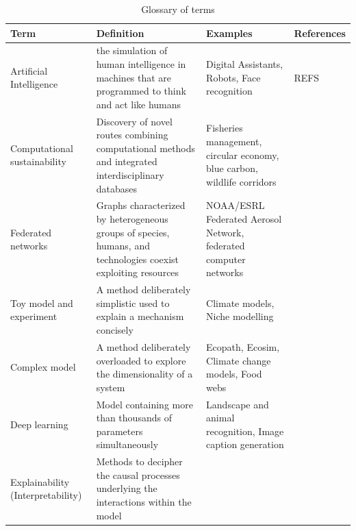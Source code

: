 \documentclass[12pt,a4paper]{article}
\begin{document}
\begin{table}[]
\begin{center}
\hspace{-0.8 in}\begin{tabular}{ |  p{2.6cm} | p{5cm} | p{4cm} | p{3cm} | }
\hline 
{\bf Term} & {\bf Definition} & {\bf Examples} & {\bf References} \tabularnewline
\hline 
Artificial Intelligence & the simulation of human intelligence in machines that are programmed to think and act like humans  & Digital Assistants, Robots, Face recognition & REFS \tabularnewline
\hline 
 Computational sustainability & Discovery of novel routes combining computational methods and integrated interdisciplinary databases & Fisheries management, circular economy, blue carbon, wildlife corridors &  \tabularnewline
\hline 
Federated networks & Graphs characterized by heterogeneous groups of species,
humans, and technologies coexist exploiting resources & NOAA/ESRL Federated Aerosol Network, federated computer networks &  \tabularnewline
\hline 
Toy model and experiment & A method deliberately simplistic used to explain a mechanism concisely & Climate models, Niche modelling & \tabularnewline
\hline 
 Complex model & A method deliberately overloaded to explore the dimensionality of a system & Ecopath, Ecosim, Climate change models, Food webs & \tabularnewline
\hline 
Deep learning & Model containing more than thousands of parameters simultaneously & Landscape and animal recognition, Image caption generation & \tabularnewline
\hline 
Explainability (Interpretability) & Methods to decipher the causal processes underlying the interactions within the model &  & \tabularnewline


\hline
\end{tabular}
\caption{Glossary of terms}
\end{center}
 \end{table}
\end{document}

